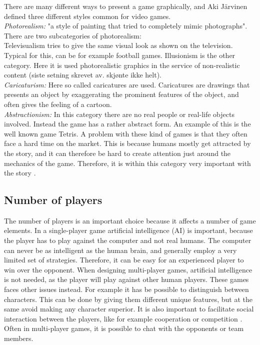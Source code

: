 There are many different ways to present a game graphically, and Aki Järvinen defined three different styles common for video games. \\ 
\emph{Photorealism:} "a style of painting that tried to completely mimic photographs". There are two subcategories of photorealism: \\
Televisualism tries to give the same visual look as shown on the television. Typical for this, can be for example football games. Illusionism is the other category. Here it is used photorealistic graphics in the service of non-realistic content (siste setning skrevet av. skjønte ikke helt). \\
\emph{Caricaturism:} Here so called caricatures are used. Caricatures are drawings that presents an object by exaggerating the prominent features of the object, and often gives the feeling of a cartoon. \\
\emph{Abstractionism:} In this category there are no real people or real-life objects involved. Instead  the game has a rather abstract form. An example of this is the well known game Tetris. A problem with these kind of games is that they often face a hard time on the market. This is because humans mostly get attracted by the story, and it can therefore be hard to create attention just around the mechanics of the game. Therefore, it is within this category very important with the story \cite{understandingvg}. 

\subsection{Number of players}
The number of players is an important choice because it affects a number of game elements. In a single-player game artificial intelligence (AI) is important, because the player has to play against the computer and not real humans. The computer can never be as intelligent as the human brain, and generally employ a very limited set of strategies. Therefore, it can be easy for an experienced player to win over the opponent. When designing multi-player games, artificial intelligence is not needed, as the player will play against other human players. These games faces other issues instead. For example it has be possible to distinguish between characters. This can be done by giving them different unique features, but at the same avoid making any character superior. It is also important to facilitate social interaction between the players, like for example cooperation or competition \cite{understandingvg}. Often in multi-player games, it is possible to chat with the opponents or team members.


